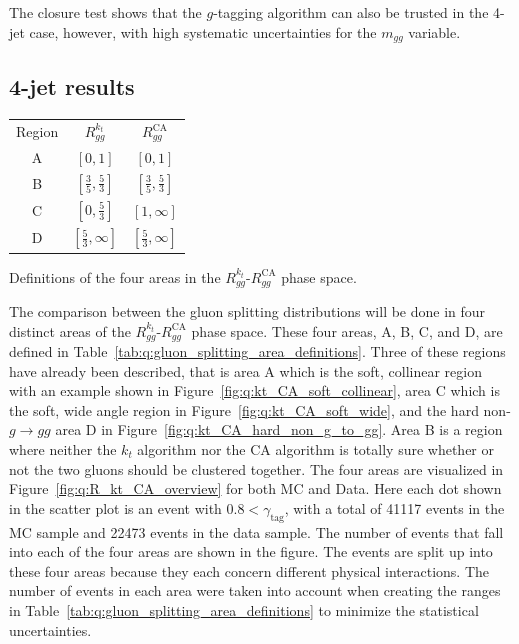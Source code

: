 The closure test shows that the $g$-tagging algorithm can also be trusted in the 4-jet case, however, with high systematic uncertainties for the $m_{gg}$ variable. 

\subsection{4-jet results}
\label{subsec:q:gluon_splitting_results}

\begin{margintable}[1cm]
  \centerfloat
  \begin{tabular}{@{}ccc@{}}
  Region  & $R_{gg}^{k_t}$                & $R_{gg}^\mathrm{CA}$    \\ \addlinespace[0.1em] \midrule \addlinespace[0.4em]
  A       & $[0, 1]$                      & $[0, 1]$                \\ \addlinespace[0.4em]
  B       & $[\frac{3}{5}, \frac{5}{3}]$  & $[\frac{3}{5}, \frac{5}{3}]$            \\ \addlinespace[0.4em]
  C       & $[0, \frac{5}{3}]$            & $[1, \infty]$           \\ \addlinespace[0.4em]
  D       & $[\frac{5}{3}, \infty]$       & $[\frac{5}{3}, \infty]$
  \end{tabular}
\vspace{1mm}
\caption[Area Definition in the $R_{gg}^{k_t}$-$R_{gg}^\mathrm{CA}$ Phase Space]{\label{tab:q:gluon_splitting_area_definitions}Definitions of the four areas in the $R_{gg}^{k_t}$-$R_{gg}^\mathrm{CA}$ phase space.}
\end{margintable}

The comparison between the gluon splitting distributions will be done in four distinct areas of the $R_{gg}^{k_t}$-$R_{gg}^\mathrm{CA}$ phase space. These four areas, A, B, C, and D, are defined in Table~\ref{tab:q:gluon_splitting_area_definitions}. Three of these regions have already been described, that is area A which is the soft, collinear region with an example shown in Figure~\ref{fig:q:kt_CA_soft_collinear}, area C which is the soft, wide angle region in Figure~\ref{fig:q:kt_CA_soft_wide}, and the hard non-$g\rightarrow gg$ area D in Figure~\ref{fig:q:kt_CA_hard_non_g_to_gg}. Area B is a region where neither the $k_t$ algorithm nor the CA algorithm is totally sure whether or not the two gluons should be clustered together. The four areas are visualized in Figure~\ref{fig:q:R_kt_CA_overview} for both MC and Data. Here each dot shown in the scatter plot is an event with $0.8 < \gamma_\mathrm{tag}$, with a total of \num{41117} events in the MC sample and \num{22473} events in the data sample. The number of events that fall into each of the four areas are shown in the figure. The events are split up into these four areas because they each concern different physical interactions. The number of events in each area were taken into account when creating the ranges in Table~\ref{tab:q:gluon_splitting_area_definitions} to minimize the statistical uncertainties. 


